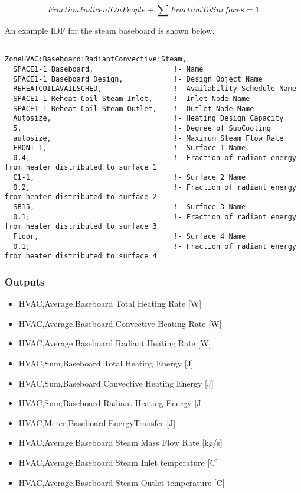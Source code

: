 \begin{equation}
FractionIndicentOnPeople + \sum {FractionToSurfaces = 1}
\end{equation}

An example IDF for the steam baseboard is shown below.

\begin{lstlisting}

ZoneHVAC:Baseboard:RadiantConvective:Steam,
  SPACE1-1 Baseboard,                   !- Name
  SPACE1-1 Baseboard Design,            !- Design Object Name
  REHEATCOILAVAILSCHED,                 !- Availability Schedule Name
  SPACE1-1 Reheat Coil Steam Inlet,     !- Inlet Node Name
  SPACE1-1 Reheat Coil Steam Outlet,    !- Outlet Node Name
  Autosize,                             !- Heating Design Capacity
  5,                                    !- Degree of SubCooling
  autosize,                             !- Maximum Steam Flow Rate
  FRONT-1,                              !- Surface 1 Name
  0.4,                                  !- Fraction of radiant energy from heater distributed to surface 1
  C1-1,                                 !- Surface 2 Name
  0.2,                                  !- Fraction of radiant energy from heater distributed to surface 2
  SB15,                                 !- Surface 3 Name
  0.1;                                  !- Fraction of radiant energy from heater distributed to surface 3
  Floor,                                !- Surface 4 Name
  0.1;                                  !- Fraction of radiant energy from heater distributed to surface 4
\end{lstlisting}

\subsubsection{Outputs}\label{outputs-1-021}

\begin{itemize}
\item
  HVAC,Average,Baseboard Total Heating Rate {[}W{]}
\item
  HVAC,Average,Baseboard Convective Heating Rate {[}W{]}
\item
  HVAC,Average,Baseboard Radiant Heating Rate {[}W{]}
\item
  HVAC,Sum,Baseboard Total Heating Energy {[}J{]}
\item
  HVAC,Sum,Baseboard Convective Heating Energy {[}J{]}
\item
  HVAC,Sum,Baseboard Radiant Heating Energy {[}J{]}
\item
  HVAC,Meter,Baseboard:EnergyTransfer {[}J{]}
\item
  HVAC,Average,Baseboard Steam Mass Flow Rate {[}kg/s{]}
\item
  HVAC,Average,Baseboard Steam Inlet temperature {[}C{]}
\item
  HVAC,Average,Baseboard Steam Outlet temperature {[}C{]}
\end{itemize}

